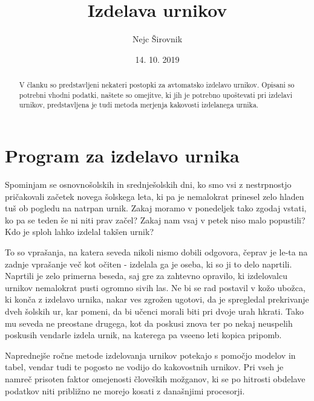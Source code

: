 \documentclass[10pt,a4paper]{article}
\begin{document}

\title{Izdelava urnikov}
\author{Nejc Širovnik}
\date{14. 10. 2019}
\maketitle


\begin{abstract}
   V članku so predstavljeni nekateri postopki za avtomatsko izdelavo urnikov. Opisani so
   potrebni vhodni podatki, naštete so omejitve, ki jih je potrebno upoštevati pri izdelavi
   urnikov, predstavljena je tudi metoda merjenja kakovosti izdelanega urnika.
\end{abstract}

\section{Program za izdelavo urnika}

Spominjam se osnovnošolskih in srednješolskih dni, ko smo vsi z nestrpnostjo pričakovali
začetek novega šolskega leta, ki pa je nemalokrat prinesel zelo hladen tuš ob pogledu na
natrpan urnik. Zakaj moramo v ponedeljek tako zgodaj vstati, ko pa se teden še ni niti
prav začel? Zakaj nam vsaj v petek niso malo popustili? Kdo je sploh lahko izdelal
takšen urnik?

To so vprašanja, na katera seveda nikoli nismo dobili odgovora, čeprav je le-ta na zadnje
vprašanje več kot očiten - izdelala ga je oseba, ki so ji to delo naprtili. Naprtili je
zelo primerna beseda, saj gre za zahtevno opravilo, ki izdelovalcu urnikov nemalokrat
pusti ogromno sivih las. Ne bi se rad postavil v kožo ubožca, ki konča z izdelavo urnika,
nakar ves zgrožen ugotovi, da je spregledal prekrivanje dveh šolskih ur, kar pomeni, da
bi učenci morali biti pri dvoje urah hkrati. Tako mu seveda ne preostane drugega, kot da
poskusi znova ter po nekaj neuspelih poskusih vendarle izdela urnik, na katerega pa vseeno
leti kopica pripomb.

Naprednejše ročne metode izdelovanja urnikov potekajo s pomočjo modelov in tabel, vendar
tudi te pogosto ne vodijo do kakovostnih urnikov. Pri vseh je namreč prisoten faktor
omejenosti človeških možganov, ki se po hitrosti obdelave podatkov niti približno ne
morejo kosati z današnjimi procesorji.
\end{document}
